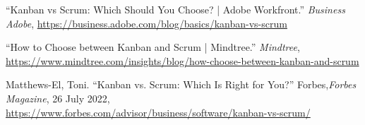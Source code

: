 {\begin{latin}
	\begingroup
	\renewcommand{\section}[2]{}%
	
\begin{thebibliography}{9}

	“Kanban vs Scrum: Which Should You Choose? | Adobe Workfront.” ‌\textit{Business Adobe}, \url{https://business.adobe.com/blog/basics/kanban-vs-scrum} 

	“How to Choose between Kanban and Scrum | Mindtree.” \textit{Mindtree}, \url{https://www.mindtree.com/insights/blog/how-choose-between-kanban-and-scrum}

	Matthews-El, Toni. “Kanban vs. Scrum: Which Is Right for You?” Forbes,\textit{Forbes Magazine}, 26 July 2022, \url{https://www.forbes.com/advisor/business/software/kanban-vs-scrum/}

	
\end{thebibliography}
\endgroup
\end{latin}

}





